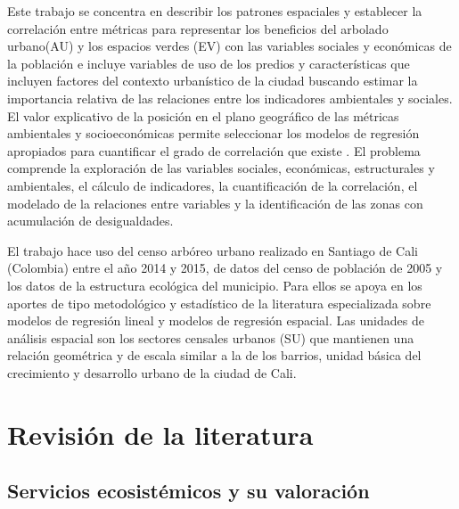 \documentclass[12pt,]{book}
\begin{document}
Este trabajo se concentra en describir los patrones espaciales y
establecer la correlación entre métricas para representar los beneficios
del arbolado urbano(AU) y los espacios verdes (EV) con las variables
sociales y económicas de la población e incluye variables de uso de los
predios y características que incluyen factores del contexto urbanístico
de la ciudad buscando estimar la importancia relativa de las relaciones
entre los indicadores ambientales y sociales. El valor explicativo de la
posición en el plano geográfico de las métricas ambientales y
socioeconómicas permite seleccionar los modelos de regresión apropiados
para cuantificar el grado de correlación que existe
\citep{fotheringham_geographically_1998}. El problema comprende la
exploración de las variables sociales, económicas, estructurales y
ambientales, el cálculo de indicadores, la cuantificación de la
correlación, el modelado de la relaciones entre variables y la
identificación de las zonas con acumulación de desigualdades.

El trabajo hace uso del censo arbóreo urbano realizado en Santiago de
Cali (Colombia) entre el año 2014 y 2015, de datos del censo de
población de 2005 y los datos de la estructura ecológica del municipio.
Para ellos se apoya en los aportes de tipo metodológico y estadístico de
la literatura especializada sobre modelos de regresión lineal y modelos
de regresión espacial. Las unidades de análisis espacial son los
sectores censales urbanos (SU) que mantienen una relación geométrica y
de escala similar a la de los barrios, unidad básica del crecimiento y
desarrollo urbano de la ciudad de Cali.

\chapter{Revisión de la literatura}\label{revlit}

\section{Servicios ecosistémicos y su
valoración}\label{servicios-ecosistemicos-y-su-valoracion}
\end{document}
